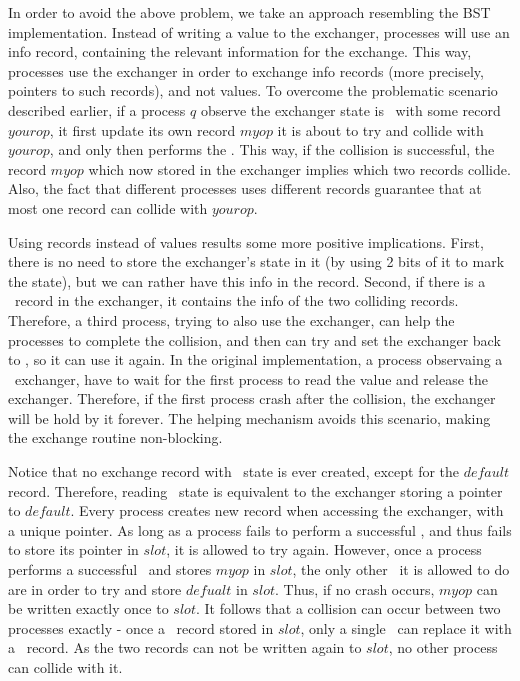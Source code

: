 In order to avoid the above problem, we take an approach resembling the BST implementation. Instead of writing a value to the exchanger, processes will use an info record, containing the relevant information for the exchange. This way, processes use the exchanger in order to exchange info records (more precisely, pointers to such records), and not values. To overcome the problematic scenario described earlier, if a process $q$ observe the exchanger state is \waiting\ with some record $yourop$, it first update its own record $myop$ it is about to try and collide with $yourop$, and only then performs the \CAS. This way, if the collision is successful, the record $myop$ which now stored in the exchanger implies which two records collide. Also, the fact that different processes uses different records guarantee that at most one record can collide with $yourop$.

Using records instead of values results some more positive implications. First, there is no need to store the exchanger's state in it (by using 2 bits of it to mark the state), but we can rather have this info in the record. Second, if there is a \busy\ record in the exchanger, it contains the info of the two colliding records. Therefore, a third process, trying to also use the exchanger, can help the processes to complete the collision, and then can try and set the exchanger back to \emptyst, so it can use it again. In the original implementation, a process observaing a \busy\ exchanger, have to wait for the first process to read the value and release the exchanger. Therefore, if the first process crash after the collision, the exchanger will be hold by it forever. The helping mechanism avoids this scenario, making the exchange routine non-blocking.

Notice that no exchange record with \emptyst\ state is ever created, except for the $default$ record. Therefore, reading \emptyst\ state is equivalent to the exchanger storing a pointer to $default$. Every process creates new record when accessing the exchanger, with a unique pointer. As long as a process fails to perform a successful \CAS, and thus fails to store its pointer in $slot$, it is allowed to try again. However, once a process performs a successful \CAS\ and stores $myop$ in $slot$, the only other \CAS\ it is allowed to do are in order to try and store $defualt$ in $slot$. Thus, if no crash occurs, $myop$ can be written exactly once to $slot$. It follows that a collision can occur between two processes exactly - once a \waiting\ record stored in $slot$, only a single \CAS\ can replace it with a \busy\ record. As the two records can not be written again to $slot$, no other process can collide with it.

